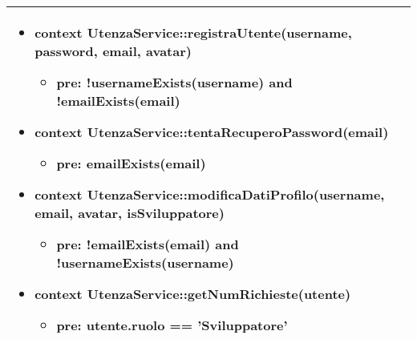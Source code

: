 \begin{tabular}{|| l | p{34em} ||}
\begin{itemize}[leftmargin=*]
	\item \textbf{context} UtenzaService::registraUtente(username, password, email, avatar)
	\begin{itemize}
		\item[ ] \textbf{pre:} !usernameExists(username) and !emailExists(email)
	\end{itemize}

	\item \textbf{context} UtenzaService::tentaRecuperoPassword(email)
	\begin{itemize}
		\item[ ] \textbf{pre:} emailExists(email)	
	\end{itemize}

	\item \textbf{context} UtenzaService::modificaDatiProfilo(username, email, avatar, isSviluppatore)
	\begin{itemize}
		\item[ ] \textbf{pre:} !emailExists(email) and !usernameExists(username)	
	\end{itemize}

	\item \textbf{context} UtenzaService::getNumRichieste(utente)
	\begin{itemize}
		\item[ ] \textbf{pre:} utente.ruolo == 'Sviluppatore'	
	\end{itemize}

\end{itemize}\\
\hline
\end{tabular}

\newpage
